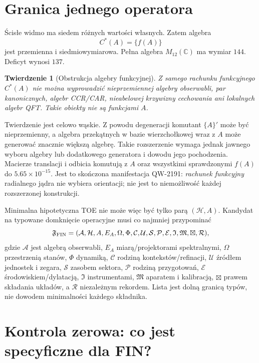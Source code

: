\documentclass[11pt,a4paper]{article}
\newtheorem{theorem}{Twierdzenie}[section]
\begin{document}
\section{Granica jednego operatora}

Ścisłe widmo ma siedem różnych wartości własnych. Zatem algebra
\[
C^*(A)=\{f(A)\}
\]
jest przemienna i siedmiowymiarowa. Pełna algebra $M_{12}(\mathbb C)$ ma wymiar $144$. Deficyt wynosi $137$.

\begin{theorem}[Obstrukcja algebry funkcyjnej]
Z samego rachunku funkcyjnego $C^*(A)$ nie można wyprowadzić nieprzemiennej algebry obserwabli, par kanonicznych, algebr CCR/CAR, nieabelowej krzywizny cechowania ani lokalnych algebr QFT. Takie obiekty nie są funkcjami $A$.
\end{theorem}

Twierdzenie jest celowo wąskie. Z powodu degeneracji komutant $\{A\}'$ może być nieprzemienny, a algebra przekątnych w bazie wierzchołkowej wraz z $A$ może generować znacznie większą algebrę. Takie rozszerzenie wymaga jednak jawnego wyboru algebry lub dodatkowego generatora i dowodu jego pochodzenia. Macierze translacji i odbicia komutują z $A$ oraz wszystkimi sprawdzonymi $f(A)$ do $5.65\times10^{-15}$. Jest to skończona manifestacja QW-2191: \emph{rachunek funkcyjny} radialnego jądra nie wybiera orientacji; nie jest to niemożliwość każdej rozszerzonej konstrukcji.

Minimalna hipotetyczna TOE nie może więc być tylko parą $(\mathcal H,A)$. Kandydat na typowane domknięcie operacyjne musi co najmniej przypominać
\begin{equation}
\mathfrak F_{\rm FIN}=
(\mathcal A,\mathcal H,A,E_A,\Omega,\Phi,\mathcal C,\mathcal U,\mathcal S,
 \mathcal P,\mathcal E,\mathfrak I,\mathfrak M,\boxtimes,\mathcal R), \label{eq:extendedfin}
\end{equation}
gdzie $\mathcal A$ jest algebrą obserwabli, $E_A$ miarą/projektorami spektralnymi, $\Omega$ przestrzenią stanów, $\Phi$ dynamiką, $\mathcal C$ rodziną kontekstów/refinacji, $\mathcal U$ źródłem jednostek i zegara, $\mathcal S$ zasobem sektora, $\mathcal P$ rodziną przygotowań, $\mathcal E$ środowiskiem/dylatacją, $\mathfrak I$ instrumentami, $\mathfrak M$ aparatem i kalibracją, $\boxtimes$ prawem składania układów, a $\mathcal R$ niezależnym rekordem. Lista jest dolną granicą typów, nie dowodem minimalności każdego składnika.

\section{Kontrola zerowa: co jest specyficzne dla FIN?}
\end{document}
